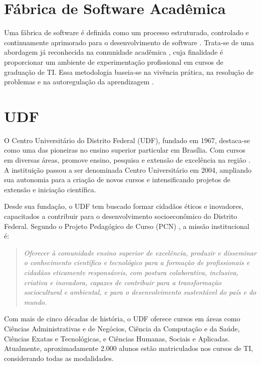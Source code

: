 \documentclass[
	12pt,           %
	openright,      %
	oneside,        %
	a4paper,        %
	brazil          %
]{abntex2}
\begin{document}
\section{F\'abrica de Software Acad{\^e}mica}
Uma fábrica de software é definida como um processo estruturado, controlado e continuamente aprimorado para o desenvolvimento de software \cite{fernandes2004fabrica}. Trata-se de uma abordagem já reconhecida na comunidade acadêmica \cite{cusumano1991japan}, cuja finalidade é proporcionar um ambiente de experimentação profissional em cursos de graduação de TI. Essa metodologia baseia-se na vivência prática, na resolução de problemas e na autoregulação da aprendizagem \cite{oliveira2017conduccao}.

\section{UDF}
O Centro Universitário do Distrito Federal (UDF), fundado em 1967, destaca-se como uma das pioneiras no ensino superior particular em Brasília. Com cursos em diversas áreas, promove ensino, pesquisa e extensão de excelência na região \cite{udfppc2023}. A instituição passou a ser denominada Centro Universitário em 2004, ampliando sua autonomia para a criação de novos cursos e intensificando projetos de extensão e iniciação científica.

Desde sua fundação, o UDF tem buscado formar cidadãos éticos e inovadores, capacitados a contribuir para o desenvolvimento socioeconômico do Distrito Federal. Segundo o Projeto Pedagógico de Curso (PCN) \cite{udfppc2023}, a missão institucional é:
\begin{quote}
    \emph{Oferecer à comunidade ensino superior de excelência, produzir e disseminar o conhecimento científico e tecnológico para a formação de profissionais e cidadãos eticamente responsáveis, com postura colaborativa, inclusiva, criativa e inovadora, capazes de contribuir para a transformação sociocultural e ambiental, e para o desenvolvimento sustentável do país e do mundo.}
\end{quote}

Com mais de cinco décadas de história, o UDF oferece cursos em áreas como Ciências Administrativas e de Negócios, Ciência da Computação e da Saúde, Ciências Exatas e Tecnológicas, e Ciências Humanas, Sociais e Aplicadas. Atualmente, aproximadamente 2.000 alunos estão matriculados nos cursos de TI, considerando todas as modalidades.
\end{document}
